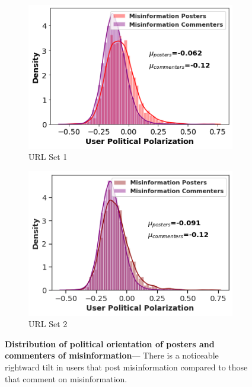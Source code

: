 \begin{figure}
\centering
\begin{subfigure}{.4\textwidth}
  \centering
\includegraphics[width=1\linewidth]{figures/misinformation_posters_commenters.png}
    \caption{URL Set 1}
\end{subfigure}
\begin{subfigure}{.4\textwidth}
  \centering
\includegraphics[width=1\linewidth]{figures/misinformation_posters_commenters2.png}
    \caption{URL Set 2}
\end{subfigure}
\caption{\textbf{Distribution of political orientation of posters and commenters of misinformation}--- There is a noticeable rightward tilt in users that post misinformation compared to those that comment on misinformation.}
\label{figure:misinformation-posters-commenters}

\end{figure}



